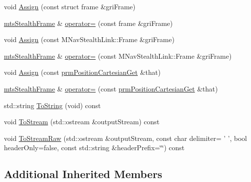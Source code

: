 \begin{DoxyCompactItemize}
\item 
void \hyperlink{classmts_stealth_frame_af72faf583bebe3370e6bbc1436f57573}{Assign} (const struct frame \&gri\-Frame)
\item 
\hyperlink{classmts_stealth_frame}{mts\-Stealth\-Frame} \& \hyperlink{classmts_stealth_frame_a2c6000a1fa5bb27fae3a4f8c51a5312d}{operator=} (const frame \&gri\-Frame)
\item 
void \hyperlink{classmts_stealth_frame_af1699a73f8dfc4704d67edc43b994e7c}{Assign} (const M\-Nav\-Stealth\-Link\-::\-Frame \&gri\-Frame)
\item 
\hyperlink{classmts_stealth_frame}{mts\-Stealth\-Frame} \& \hyperlink{classmts_stealth_frame_aa96c149a0a583ec83a64142410f4c8c6}{operator=} (const M\-Nav\-Stealth\-Link\-::\-Frame \&gri\-Frame)
\item 
void \hyperlink{classmts_stealth_frame_ae570300bb135a8e9ab81d81e5456c552}{Assign} (const \hyperlink{classprm_position_cartesian_get}{prm\-Position\-Cartesian\-Get} \&that)
\item 
\hyperlink{classmts_stealth_frame}{mts\-Stealth\-Frame} \& \hyperlink{classmts_stealth_frame_a8350558bec876d3c65c609aecf3e2512}{operator=} (const \hyperlink{classprm_position_cartesian_get}{prm\-Position\-Cartesian\-Get} \&that)
\item 
std\-::string \hyperlink{classmts_stealth_frame_a04cfb56c66017fc8029c81ac91655e26}{To\-String} (void) const 
\item 
void \hyperlink{classmts_stealth_frame_ac6f6690c08ffaaad27f589a7dae4da28}{To\-Stream} (std\-::ostream \&output\-Stream) const 
\item 
void \hyperlink{classmts_stealth_frame_a0b6205e28c29ccc0ba25c553bea02419}{To\-Stream\-Raw} (std\-::ostream \&output\-Stream, const char delimiter= ' ', bool header\-Only=false, const std\-::string \&header\-Prefix=\char`\"{}\char`\"{}) const 
\end{DoxyCompactItemize}
\subsection*{Additional Inherited Members}


